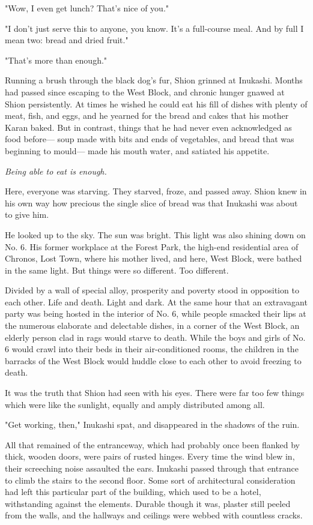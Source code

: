 "Wow, I even get lunch? That's nice of you."

"I don't just serve this to anyone, you know. It's a full-course meal.
And by full I mean two: bread and dried fruit."

"That's more than enough."

Running a brush through the black dog's fur, Shion grinned at Inukashi.
Months had passed since escaping to the West Block, and chronic hunger
gnawed at Shion persistently. At times he wished he could eat his fill
of dishes with plenty of meat, fish, and eggs, and he yearned for the
bread and cakes that his mother Karan baked. But in contrast, things
that he had never even acknowledged as food before--- soup made with bits
and ends of vegetables, and bread that was beginning to mould--- made his
mouth water, and satiated his appetite.

\emph{Being able to eat is enough.}

Here, everyone was starving. They starved, froze, and passed away. Shion
knew in his own way how precious the single slice of bread was that
Inukashi was about to give him.

He looked up to the sky. The sun was bright. This light was also shining
down on No. 6. His former workplace at the Forest Park, the high-end
residential area of Chronos, Lost Town, where his mother lived, and
here, West Block, were bathed in the same light. But things were so
different. Too different.

Divided by a wall of special alloy, prosperity and poverty stood in
opposition to each other. Life and death. Light and dark. At the same
hour that an extravagant party was being hosted in the interior of No.
6, while people smacked their lips at the numerous elaborate and
delectable dishes, in a corner of the West Block, an elderly person clad
in rags would starve to death. While the boys and girls of No. 6 would
crawl into their beds in their air-conditioned rooms, the children in
the barracks of the West Block would huddle close to each other to avoid
freezing to death.

It was the truth that Shion had seen with his eyes. There were far too
few things which were like the sunlight, equally and amply distributed
among all.

"Get working, then," Inukashi spat, and disappeared in the shadows of
the ruin.

\mybreak 
All that remained of the entranceway, which had probably once been
flanked by thick, wooden doors, were pairs of rusted hinges. Every time
the wind blew in, their screeching noise assaulted the ears. Inukashi
passed through that entrance to climb the stairs to the second floor.
Some sort of architectural consideration had left this particular part
of the building, which used to be a hotel, withstanding against the
elements. Durable though it was, plaster still peeled from the walls,
and the hallways and ceilings were webbed with countless cracks.

